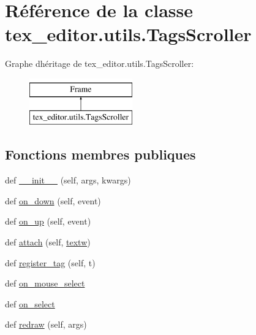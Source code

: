 \hypertarget{classtex__editor_1_1utils_1_1_tags_scroller}{}\section{Référence de la classe tex\+\_\+editor.\+utils.\+Tags\+Scroller}
\label{classtex__editor_1_1utils_1_1_tags_scroller}
Graphe d\textquotesingle{}héritage de tex\+\_\+editor.\+utils.\+Tags\+Scroller\+:\begin{figure}[H]
\begin{center}
\leavevmode
\includegraphics[height=2.000000cm]{classtex__editor_1_1utils_1_1_tags_scroller}
\end{center}
\end{figure}
\subsection*{Fonctions membres publiques}
\begin{DoxyCompactItemize}
\item 
def \hyperlink{classtex__editor_1_1utils_1_1_tags_scroller_a04847d8e03096beb46a820052bb165b1}{\+\_\+\+\_\+init\+\_\+\+\_\+} (self, args, kwargs)
\item 
def \hyperlink{classtex__editor_1_1utils_1_1_tags_scroller_ac2c15ab31c416af4976efc24bb2408bd}{on\+\_\+down} (self, event)
\item 
def \hyperlink{classtex__editor_1_1utils_1_1_tags_scroller_a238fd796f7ac965d377b74ecf057d1af}{on\+\_\+up} (self, event)
\item 
def \hyperlink{classtex__editor_1_1utils_1_1_tags_scroller_ad7cd936a75219c4e33cbb39219e41c35}{attach} (self, \hyperlink{classtex__editor_1_1utils_1_1_tags_scroller_a19ed18ecd55f3bfe63a8d5e4717d0067}{textw})
\item 
def \hyperlink{classtex__editor_1_1utils_1_1_tags_scroller_a8e022b12638ba173b6801136e318759d}{register\+\_\+tag} (self, t)
\item 
def \hyperlink{classtex__editor_1_1utils_1_1_tags_scroller_acf7fab0a469d21f79befddb50aa65559}{on\+\_\+mouse\+\_\+select}
\item 
def \hyperlink{classtex__editor_1_1utils_1_1_tags_scroller_afbae051467ce0f0b73bce32f5d80c2e9}{on\+\_\+select}
\item 
def \hyperlink{classtex__editor_1_1utils_1_1_tags_scroller_a84633bb40ca72ed20d83b096e9cecfe5}{redraw} (self, args)
\end{DoxyCompactItemize}
